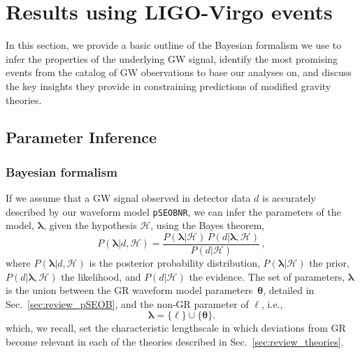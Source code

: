 \documentclass[twocolumn,
               prd,
               aps,
               superscriptaddress,
               tightenlines,
               nofootinbib,
               eqsecnum,
               amsfonts,
               amsmath,
               longbibliography]{revtex4-1}
\newcommand{\pSEOB}{\texttt{pSEOBNR}}
\newcommand{\hs}[1]{{\textcolor{blue}{{[HS: #1]}} }}
\begin{document}

\section{Results using LIGO-Virgo events}
\label{sec:results}

In this section, we provide a basic outline of the Bayesian formalism we use to
infer the properties of the underlying GW signal, identify the most promising
events from the catalog of GW observations to base our analyses on, and discuss
the key insights they provide in constraining predictions of modified gravity
theories.

\subsection{Parameter Inference}

\subsubsection{Bayesian formalism}
If we assume that a GW signal observed in detector data $d$ is accurately
described by our waveform model \pSEOB{}, we can infer the parameters of the
model, $\bm{\lambda}$, given the hypothesis $\mathcal{H}$, using the Bayes
theorem,
%
\begin{equation}
P(\bm{\lambda} \vert d, \mathcal{H}) =
\frac{P(\bm{\lambda} \vert \mathcal{H}) \, P(d \vert \bm{\lambda},\mathcal{H})}{P(d \vert \mathcal{H})}\,,
\label{eq:bayes}
\end{equation}
%
where $P(\bm{\lambda} \vert d, \mathcal{H})$ is the posterior probability distribution,
$P(\bm{\lambda} \vert \mathcal{H})$ the prior,
$P(d \vert \bm{\lambda},\mathcal{H})$ the likelihood, and
$P(d \vert \mathcal{H})$ the evidence.
%
The set of parameters, $\bm{\lambda}$ is the union between the GR waveform
model parameters~$\bm{\theta}$, detailed in Sec.~\ref{sec:review_pSEOB}, and
the non-GR parameter of $\ell$, i.e.,
%
\begin{equation}
\bm{\lambda} = \{\ell\} \cup \{\bm{\theta}\}.
\label{eq:def_params}
\end{equation}
%
which, we recall, set the characteristic lengthscale in which deviations from
GR become relevant in each of the theories described in
Sec.~\ref{sec:review_theories}.
\end{document}
